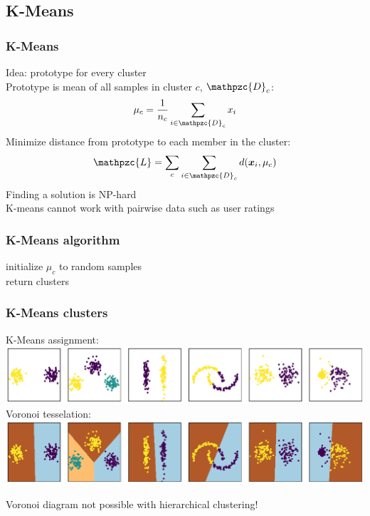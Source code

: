 \documentclass[Nike]{tuberlinbeamer}
\newcommand{\x}{\boldsymbol{x}}
\begin{document}
\subsection{K-Means}
\begin{frame}
  \frametitle{K-Means}
  Idea: prototype for every cluster
  \\
  Prototype is mean of all samples in cluster $c$, $\mathpzc{D}_c$:
  \begin{equation*}
    \mu_c = \frac{1}{n_c} \sum_{i \in \mathpzc{D}_c} x_i
  \end{equation*}
  \pause
  Minimize distance from prototype to each member in the cluster:
  \begin{equation*}
    \mathpzc{L} = \sum_c \sum_{i \in \mathpzc{D}_c} d(\x_i, \mu_c)
  \end{equation*}
  \pause
  Finding a solution is NP-hard
  \\
  K-means cannot work with pairwise data such as user ratings
\end{frame}


\begin{frame}
  \frametitle{K-Means algorithm}
  initialize $\mu_c$ to random samples\\
  return clusters
\end{frame}


\begin{frame}
  \frametitle{K-Means clusters}
  \begin{center}
    K-Means assignment:
    \centering\includegraphics[width=1.0\textwidth]{kmeans_clusters.pdf}
    \pause
    Voronoi tesselation:
    \centering\includegraphics[width=1.0\textwidth]{kmeans_clusters_voronoi.pdf}
  \end{center}
  Voronoi diagram not possible with hierarchical clustering!
\end{frame}
\end{document}

